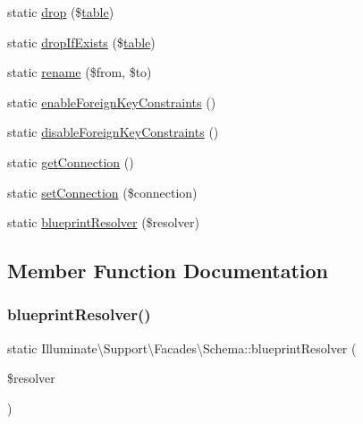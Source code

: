\begin{DoxyCompactItemize}
\item 
static \mbox{\hyperlink{class_illuminate_1_1_support_1_1_facades_1_1_schema_a16d4c977856e4fd5582755a1547e3881}{drop}} (\$\mbox{\hyperlink{class_illuminate_1_1_support_1_1_facades_1_1_schema_ad6ab62c6365903825576c7725ae5d113}{table}})
\item 
static \mbox{\hyperlink{class_illuminate_1_1_support_1_1_facades_1_1_schema_a0fd72c4ae5aa60f76c6e3fbfedd3f945}{drop\+If\+Exists}} (\$\mbox{\hyperlink{class_illuminate_1_1_support_1_1_facades_1_1_schema_ad6ab62c6365903825576c7725ae5d113}{table}})
\item 
static \mbox{\hyperlink{class_illuminate_1_1_support_1_1_facades_1_1_schema_afbb25e9834f240d6f2f277fe9c8261ba}{rename}} (\$from, \$to)
\item 
static \mbox{\hyperlink{class_illuminate_1_1_support_1_1_facades_1_1_schema_a4fb3e10a8f2df11c7d8d18a261069d2b}{enable\+Foreign\+Key\+Constraints}} ()
\item 
static \mbox{\hyperlink{class_illuminate_1_1_support_1_1_facades_1_1_schema_a98992c90d226e66d40197bf672bf5e6b}{disable\+Foreign\+Key\+Constraints}} ()
\item 
static \mbox{\hyperlink{class_illuminate_1_1_support_1_1_facades_1_1_schema_a4f97c5e3cf2b8de2d39745e974681381}{get\+Connection}} ()
\item 
static \mbox{\hyperlink{class_illuminate_1_1_support_1_1_facades_1_1_schema_a890d5ea8487ac8f948ffa1a5a449de11}{set\+Connection}} (\$connection)
\item 
static \mbox{\hyperlink{class_illuminate_1_1_support_1_1_facades_1_1_schema_a3be626be7f897ee0b9afd81ef95f6825}{blueprint\+Resolver}} (\$resolver)
\end{DoxyCompactItemize}


\subsection{Member Function Documentation}
\mbox{\label{class_illuminate_1_1_support_1_1_facades_1_1_schema_a3be626be7f897ee0b9afd81ef95f6825}} 
\subsubsection{\texorpdfstring{blueprint\+Resolver()}{blueprintResolver()}}
{\footnotesize\ttfamily static Illuminate\textbackslash{}\+Support\textbackslash{}\+Facades\textbackslash{}\+Schema\+::blueprint\+Resolver (\begin{DoxyParamCaption}\item[{}]{\$resolver }\end{DoxyParamCaption})\hspace{0.3cm}{\ttfamily [static]}}

